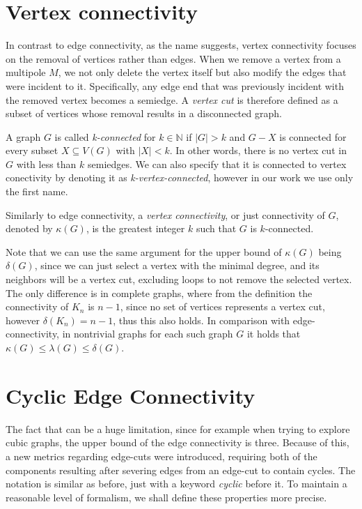 \documentclass[12pt, twoside]{book}
\begin{document}
\section{Vertex connectivity}

In contrast to edge connectivity, as the name suggests, vertex connectivity focuses on the removal of vertices rather than edges. When we remove a vertex from a multipole $M$, we not only delete the vertex itself but also modify the edges that were incident to it. Specifically, any edge end that was previously incident with the removed vertex becomes a semiedge. A \textit{vertex cut} is therefore defined as a subset of vertices whose removal results in a disconnected graph.

A graph $G$ is called \textit{k-connected} for $k\in\mathbb{N}$ if $|G|>k$ and $G-X$ is connected for every subset $X\subseteq V(G)$ with $|X|<k$. In other words, there is no vertex cut in $G$ with less than $k$ semiedges. We can also specify that it is connected to vertex conectivity by denoting it as \textit{k-vertex-connected}, however in our work we use only the first name.

Similarly to edge connectivity, a \textit{vertex connectivity}, or just connectivity of $G$, denoted by $\kappa(G)$, is the greatest integer $k$ such that $G$ is $k$-connected.

Note that we can use the same argument for the upper bound of $\kappa(G)$ being $\delta(G)$, since we can just select a vertex with the minimal degree, and its neighbors will be a vertex cut, excluding loops to not remove the selected vertex. The only difference is in complete graphs, where from the definition the connectivity of $K_n$ is $n-1$, since no set of vertices represents a vertex cut, however $\delta(K_n)=n-1$, thus this also holds. In comparison with edge-connectivity, in nontrivial graphs for each such graph $G$ it holds that $\kappa(G)\leq \lambda(G) \leq \delta(G)$.

\section{Cyclic Edge Connectivity}\label{sec:cyclic-edge-connectivity}

The fact that  can be a huge limitation, since for example when trying to explore cubic graphs, the upper bound of the edge connectivity is three. Because of this, a new metrics regarding edge-cuts were introduced, requiring both of the components resulting after severing edges from an edge-cut to contain cycles. The notation is similar as before, just with a keyword \textit{cyclic} before it. To maintain a reasonable level of formalism, we shall define these properties more precise.
\end{document}
